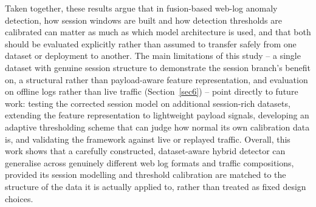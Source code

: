\documentclass[futureinternet,article,submit,moreauthors]{Definitions/mdpi}
\begin{document}
Taken together, these results argue that in fusion-based web-log anomaly detection, how session windows are built and how detection thresholds are calibrated can matter as much as which model architecture is used, and that both should be evaluated explicitly rather than assumed to transfer safely from one dataset or deployment to another. The main limitations of this study -- a single dataset with genuine session structure to demonstrate the session branch's benefit on, a structural rather than payload-aware feature representation, and evaluation on offline logs rather than live traffic (Section~\ref{sec6}) -- point directly to future work: testing the corrected session model on additional session-rich datasets, extending the feature representation to lightweight payload signals, developing an adaptive thresholding scheme that can judge how normal its own calibration data is, and validating the framework against live or replayed traffic. Overall, this work shows that a carefully constructed, dataset-aware hybrid detector can generalise across genuinely different web log formats and traffic compositions, provided its session modelling and threshold calibration are matched to the structure of the data it is actually applied to, rather than treated as fixed design choices.

\vspace{6pt}





\end{document}
